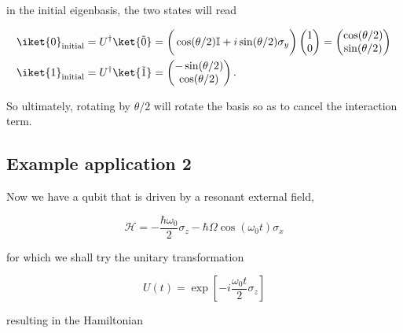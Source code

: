   \noindent in the initial eigenbasis, the two states will read

  \begin{equation}\label{uniInitial}
    \begin{aligned}
      \iket{0}_{\text{initial}}     &    =     U^{\dagger}\ket{\tilde{0}}    =
      \bigg(\cos(\theta/2)\mathbb{I}+i\sin(\theta/2)\sigma_y\bigg)\begin{pmatrix}
        1\\0
      \end{pmatrix} = \begin{pmatrix} \cos(\theta/2)\\\sin(\theta/2)
      \end{pmatrix} \\
      \iket{1}_{\text{initial}}      &       =      U^{\dagger}\ket{\tilde{1}}
      = \begin{pmatrix} -\sin(\theta/2)\\\cos(\theta/2)
      \end{pmatrix}.
    \end{aligned}
  \end{equation}


  \noindent  So ultimately,  rotating by  $ \theta/2  $ will  rotate the
  basis so as to cancel the interaction term.

 \subsection{Example application 2\label{subsec:Rabi}}
 Now  we have  a qubit  that  is driven  by a  resonant external  field,

  \begin{equation}\label{app2}
    \mathcal{H} = -\frac{\hbar\omega_0}{2}\sigma_z-\hbar\Omega\cos(\omega_0 t)\sigma_x
  \end{equation}

  \noindent for which we shall try the unitary transformation

  \begin{equation}\label{app2Try}
    U(t) = \exp\left[-i\frac{\omega_0 t}{2}\sigma_z\right]
  \end{equation}

  \noindent resulting in the Hamiltonian

